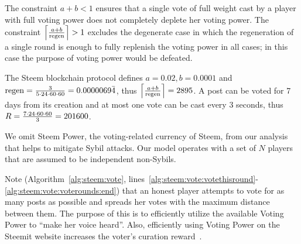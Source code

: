 \begin{remark}
  The constraint $a + b < 1$ ensures that a single vote of full weight cast by a
  player with full voting power does not completely deplete her voting power.
  The constraint $\ceil*{\frac{a + b}{\regen}} > 1$ excludes the degenerate
  case in which the regeneration of a single round is enough to fully replenish
  the voting power in all cases; in this case the purpose of voting power would
  be defeated.
\end{remark}

\begin{remark}
  The Steem blockchain protocol defines $a = 0.02, b = 0.0001$ and $\regen =
  \frac{3}{5 \cdot 24 \cdot 60 \cdot 60} = 0.0000069\bar{4}$, thus
  $\ceil*{\frac{a + b}{\regen}} = 2895$. A post can be voted for 7 days from its
  creation and at most one vote can be cast every 3 seconds, thus $\rounds =
  \frac{7 \cdot 24 \cdot 60 \cdot 60}{3} = 201600$.
\end{remark}

\begin{remark}
  We omit Steem Power, the voting-related currency of Steem, from our analysis that helps to mitigate Sybil attacks. Our model operates with a set of $N$ players that are assumed to be independent non-Sybils.
\end{remark}

\begin{remark}
  Note (Algorithm~\ref{alg:steem:vote},
  lines~\ref{alg:steem:vote:votethisround}-\ref{alg:steem:vote:voterounds:end})
  that an honest player attempts to vote for as many posts as possible and
  spreads her votes with the maximum distance between them. The purpose of this
  is to efficiently utilize the available Voting Power to ``make her voice
  heard''. Also, efficiently using Voting Power on the Steemit website increases
  the voter's curation reward~\cite{curationRewards}.
\end{remark}
